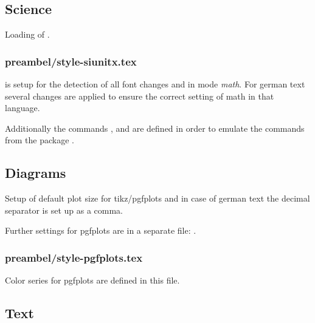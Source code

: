 \subsection{Science}

Loading of .


\subsubsection{preambel/style-siunitx.tex}

 is setup for the detection of all font changes and in mode \emph{math}. For german text several changes are applied to ensure the correct setting of math in that language.

Additionally the commands ,  and  are defined in order to emulate the commands from the package .


\subsection{Diagrams}

Setup of default plot size for tikz/pgfplots and in case of german text the decimal separator is set up as a comma.

Further settings for pgfplots are in a separate file: .


\subsubsection{preambel/style-pgfplots.tex}

Color series for pgfplots are defined in this file.


\subsection{Text}

